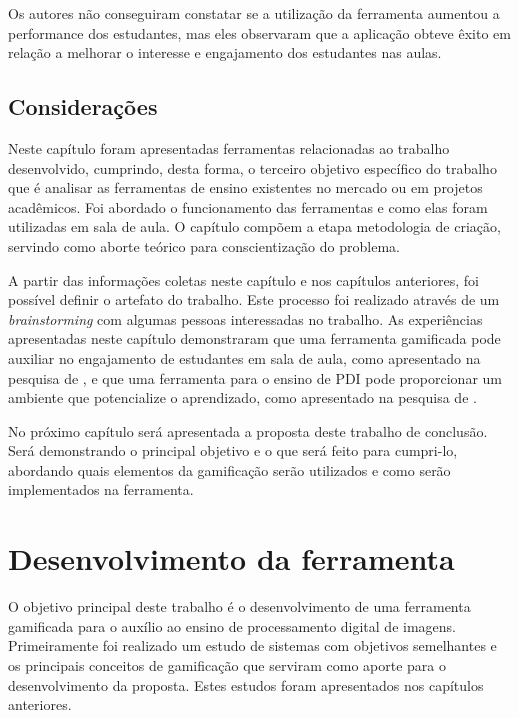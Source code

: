 \documentclass[
	12pt,				%
	oneside,			%
	a4paper,			%
	english,			%
	french,				%
	spanish,			%
	brazil,				%
	]{abntex2}
\begin{document}
Os autores não conseguiram constatar se a utilização da ferramenta aumentou a performance dos estudantes, mas eles observaram que a aplicação obteve êxito em relação a melhorar o interesse e engajamento dos estudantes nas aulas.

\section{Considerações}

Neste capítulo foram apresentadas ferramentas relacionadas ao trabalho desenvolvido, cumprindo, desta forma, o terceiro objetivo específico do trabalho que é analisar as ferramentas de ensino existentes no mercado ou em projetos acadêmicos. Foi abordado o funcionamento das ferramentas e como elas foram utilizadas em sala de aula. O capítulo compõem a etapa metodologia de criação, servindo como aborte teórico para conscientização do problema. 

A partir das informações coletas neste capítulo e nos capítulos anteriores, foi possível definir o artefato do trabalho. Este processo foi realizado através de um \textit{brainstorming} com algumas pessoas interessadas no trabalho. As experiências apresentadas neste capítulo demonstraram que uma ferramenta gamificada pode auxiliar no engajamento de estudantes em sala de aula, como apresentado na pesquisa de \citet{de2013classroom}, e que uma ferramenta para o ensino de PDI pode proporcionar um ambiente que potencialize o aprendizado, como apresentado na pesquisa de \citet{cazorla2015javavis}.

No próximo capítulo será apresentada a proposta deste trabalho de conclusão. Será demonstrando o principal objetivo e o que será feito para cumpri-lo, abordando quais elementos da gamificação serão utilizados e como serão implementados na ferramenta.

\chapter{Desenvolvimento da ferramenta} 

O objetivo principal deste trabalho é o desenvolvimento de uma ferramenta gamificada para o auxílio ao ensino de processamento digital de imagens. Primeiramente foi realizado um estudo de sistemas com objetivos semelhantes e os principais conceitos de gamificação que serviram como aporte para o desenvolvimento da proposta. Estes estudos foram apresentados nos capítulos anteriores.
    
\end{document}
